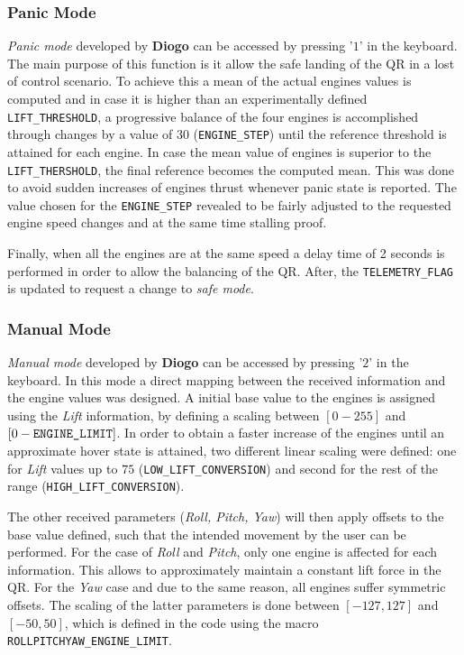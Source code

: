 \documentclass{article}
\begin{document}
\subsubsection{Panic Mode}
\textit{Panic mode} developed by \textbf{Diogo} can be accessed by pressing '$1$' in the keyboard. The main purpose of this function is it allow the safe landing of the QR in a lost of control scenario. To achieve this a mean of the actual engines values is computed and in case it is higher than an experimentally defined \texttt{LIFT\_THRESHOLD}, a progressive balance of the four engines is accomplished through changes by a value of $30$ (\texttt{ENGINE\_STEP}) until the reference threshold is attained for each engine. In case the mean value of engines is superior to the \texttt{LIFT\_THERSHOLD}, the final reference becomes the computed mean. This was done to avoid sudden increases of engines thrust whenever panic state is reported. The value chosen for the \texttt{ENGINE\_STEP} revealed to be fairly adjusted to the requested engine speed changes and at the same time stalling proof.

Finally, when all the engines are at the same speed a delay time of 2 seconds is performed in order to allow the balancing of the QR. After, the \texttt{TELEMETRY\_FLAG} is updated to request a change to \textit{safe mode}.

\subsubsection{Manual Mode}
\textit{Manual mode} developed by \textbf{Diogo} can be accessed by pressing '$2$' in the keyboard. In this mode a direct mapping between the received information and the engine values was designed. A initial base value to the engines is assigned using the \textit{Lift} information, by defining a scaling between $[0-255]$ and $[0-\text{\texttt{ENGINE\_LIMIT}}]$. In order to obtain a faster increase of the engines until an approximate hover state is attained, two different linear scaling were defined: one for \textit{Lift} values up to $75$ (\texttt{LOW\_LIFT\_CONVERSION}) and second for the rest of the range (\texttt{HIGH\_LIFT\_CONVERSION}).

The other received parameters (\textit{Roll, Pitch, Yaw}) will then apply offsets to the base value defined, such that the intended movement by the user can be performed. For the case of \textit{Roll} and \textit{Pitch}, only one engine is affected for each information. This allows to approximately maintain a constant lift force in the QR. For the \textit{Yaw} case and due to the same reason, all engines suffer symmetric offsets. The scaling of the latter parameters is done between $[-127,127]$ and $[-50,50]$, which is defined in the code using the macro \texttt{ROLLPITCHYAW\_ENGINE\_LIMIT}. 
\end{document}

